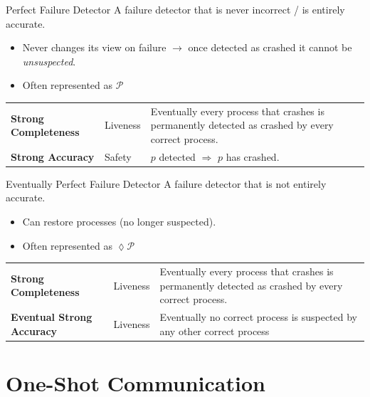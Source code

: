 \begin{definitionbox}{Perfect Failure Detector}
  A failure detector that is never incorrect / is entirely accurate.
  \begin{itemize}
    \item Never changes its view on failure $\to$ once detected as crashed it cannot be \textit{unsuspected}.
    \item Often represented as $\mathcal{P}$
  \end{itemize}
  \begin{center}
    \begin{tabular}{l l p{}}
      \textbf{Strong Completeness} & Liveness & Eventually every process that crashes is permanently detected as crashed by every correct process. \\
      \textbf{Strong Accuracy} & Safety & $p$ detected $\Rightarrow$ $p$ has crashed. \\
    \end{tabular}
\end{center}
\end{definitionbox}

\begin{definitionbox}{Eventually Perfect Failure Detector}
  A failure detector that is not entirely accurate.
  \begin{itemize}
    \item Can restore processes (no longer suspected).
    \item Often represented as $ \lozenge  \mathcal{P}$
  \end{itemize}
  \begin{center}
    \begin{tabular}{l l p{}}
      \textbf{Strong Completeness} & Liveness & Eventually every process that crashes is permanently detected as crashed by every correct process.  \\
      \textbf{Eventual Strong Accuracy} & Liveness & Eventually no correct process is suspected by any other correct process \\
    \end{tabular}
\end{center}
\end{definitionbox}

\section{One-Shot Communication}


